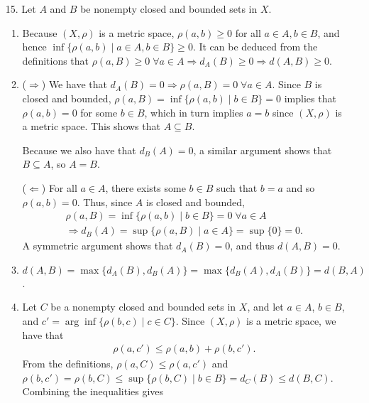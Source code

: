 \documentclass[a4paper,12pt]{article}
\begin{document}
\begin{enumerate}
    \item[15.]
        Let $A$ and $B$ be nonempty closed and bounded sets in $X$.
        \begin{enumerate}
            \item
                Because $(X, \rho)$ is a metric space, $\rho(a, b) \geq 0$ for all $a \in A, b \in B$, and hence $\inf\{ \rho(a, b) \mid a \in A, b \in B\} \geq 0$. It can be deduced from the definitions that $\rho(a, B) \geq 0 \; \forall a \in A \Rightarrow d_A(B) \geq 0 \Rightarrow d(A, B) \geq 0$.
            \item
                ($\Rightarrow$) We have that $d_A(B) = 0 \Rightarrow \rho(a, B) = 0 \; \forall a \in A$. Since $B$ is closed and bounded, $\rho(a, B) = \inf\{ \rho(a, b) \mid b \in B \} = 0$ implies that $\rho(a, b) = 0$ for some $b \in B$, which in turn implies $a = b$ since $(X, \rho)$ is a metric space. This shows that $A \subseteq B$. \par
                Because we also have that $d_B(A) = 0$, a similar argument shows that $B \subseteq A$, so $A = B$. \par
                ($\Leftarrow$) For all $a \in A$, there exists some $b \in B$ such that $b = a$ and so $\rho(a, b) = 0$. Thus, since $A$ is closed and bounded,
                \begin{gather*}
                    \rho(a, B) = \inf\{ \rho(a, b) \mid b \in B \} = 0 \; \forall a \in A \\
                    \Rightarrow d_B(A) = \sup\{ \rho(a, B) \mid a \in A \} = \sup\{ 0 \} = 0.
                \end{gather*}
                A symmetric argument shows that $d_A(B) = 0$, and thus $d(A, B) = 0$.
            \item
                $d(A, B) = \max\{ d_A(B), d_B(A) \} = \max\{ d_B(A), d_A(B) \} = d(B, A)$.
            \item
                Let $C$ be a nonempty closed and bounded sets in $X$, and let $a \in A$, $b \in B$, and $c' = \arg\inf\{ \rho(b, c) \mid c \in C \}$. Since $(X, \rho)$ is a metric space, we have that
                \begin{align*}
                    \rho(a, c') \leq \rho(a, b) + \rho(b, c').
                \end{align*}
                From the definitions, $\rho(a, C) \leq \rho(a, c')$ and $\rho(b, c') = \rho(b, C) \leq \sup\{ \rho(b, C) \mid b \in B \} = d_C(B) \leq d(B, C)$. Combining the inequalities gives
                \begin{align} \label{eq:triangle}

\end{align}
\end{enumerate}
\end{enumerate}
\end{document}
